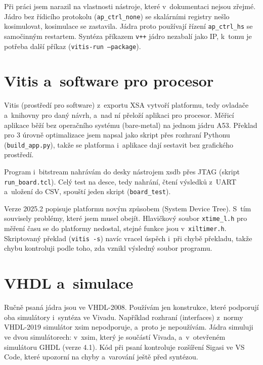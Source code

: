 Při práci jsem narazil na vlastnosti nástroje, které v~dokumentaci nejsou zřejmé. Jádro bez řídicího protokolu (\texttt{ap\_ctrl\_none}) se skalárními registry nešlo kosimulovat, kosimulace se zastavila. Jádra proto používají řízení \texttt{ap\_ctrl\_hs} se samočinným restartem. Syntéza příkazem \texttt{v++} jádro nezabalí jako IP, k~tomu je potřeba další příkaz (\texttt{vitis-run --package}).


\section{Vitis a~software pro procesor}
\label{sec:vitis-sw}

Vitis (prostředí pro software) z~exportu XSA vytvoří platformu, tedy ovladače a~knihovny pro daný návrh, a~nad ní přeloží aplikaci pro procesor. Měřicí aplikace běží bez operačního systému (bare-metal) na jednom jádru A53. Překlad pro 3 úrovně optimalizace jsem napsal jako skript přes rozhraní Pythonu (\texttt{build\_app.py}), takže se platforma i~aplikace dají sestavit bez grafického prostředí.

Program i~bitstream nahrávám do desky nástrojem xsdb přes JTAG (skript \texttt{run\_board.tcl}). Celý test na desce, tedy nahrání, čtení výsledků z~UART a~uložení do CSV, spouští jeden skript (\texttt{board\_test}).

Verze 2025.2 popisuje platformu novým způsobem (System Device Tree). S~tím souvisely problémy, které jsem musel obejít. Hlavičkový soubor \texttt{xtime\_l.h} pro měření času se do platformy nedostal, stejné funkce jsou v~\texttt{xiltimer.h}. Skriptovaný překlad (\texttt{vitis -s}) navíc vracel úspěch i~při chybě překladu, takže chybu kontroluji podle toho, zda vznikl výsledný soubor programu.

\section{VHDL a~simulace}
\label{sec:vhdl}

Ručně psaná jádra jsou ve VHDL-2008. Používám jen konstrukce, které podporují oba simulátory i~syntéza ve Vivadu. Například rozhraní (interfaces) z~normy VHDL-2019 simulátor xsim nepodporuje, a~proto je nepoužívám. Jádra simuluji ve dvou simulátorech: v~xsim, který je součástí Vivada, a~v~otevřeném simulátoru GHDL (verze 4.1). Kód při psaní kontroluje rozšíření Sigasi ve VS Code, které upozorní na chyby a~varování ještě před syntézou.

